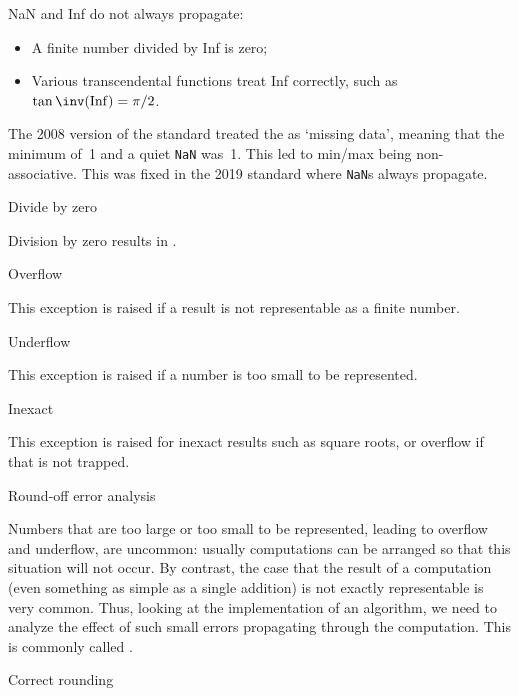 \begin{remark}
  NaN and Inf do not always propagate:
  \begin{itemize}
  \item A finite number divided by Inf is zero;
  \item Various transcendental functions treat Inf correctly,
    such as $\tan\inv(\mathrm{Inf})=\pi/2$.
  \end{itemize}

  The 2008 version of the standard treated the 
  as `missing data', meaning that the minimum of~1 and a quiet \texttt{NaN} was~1.
  This led to min/max being non-associative. This was fixed in the 2019 standard
  where \texttt{NaN}s always propagate.
\end{remark}


 {Divide by zero}

Division by zero results in .

 {Overflow}

This exception is raised if a result is not representable
as a finite number.

 {Underflow}

This exception is raised if a number is too small to be represented.

 {Inexact}

This exception is raised for inexact results such as square roots,
or overflow if that is not trapped.

 {Round-off error analysis}
\label{sec:roundoff}

Numbers that are too large or too small to be represented, leading to
overflow and underflow, are
uncommon: usually computations can be arranged so that this situation
will not occur. By contrast, the case that the result of a computation
(even something as simple as a single addition) 
is not exactly representable is very common.
Thus, looking at the
implementation of an algorithm, we need to analyze the
effect of such small errors propagating through the computation.
This is commonly called
.

 {Correct rounding}
\label{sec:correct-round}

